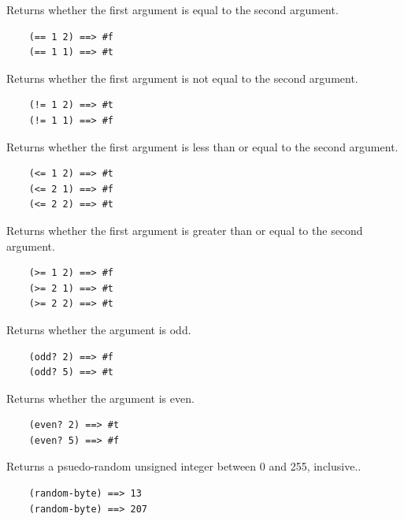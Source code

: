 \documentclass[12pt]{article}
\begin{document}
Returns whether the first argument is equal to the second argument.

\begin{verbatim}
    (== 1 2) ==> #f
    (== 1 1) ==> #t
\end{verbatim}


Returns whether the first argument is not equal to the second argument.

\begin{verbatim}
    (!= 1 2) ==> #t
    (!= 1 1) ==> #f
\end{verbatim}


Returns whether the first argument is less than or equal to the second
argument. 

\begin{verbatim}
    (<= 1 2) ==> #t
    (<= 2 1) ==> #f
    (<= 2 2) ==> #t
\end{verbatim}


Returns whether the first argument is greater than or equal to the
second argument. 

\begin{verbatim}
    (>= 1 2) ==> #f
    (>= 2 1) ==> #t
    (>= 2 2) ==> #t
\end{verbatim}


Returns whether the argument is odd.

\begin{verbatim}
    (odd? 2) ==> #f
    (odd? 5) ==> #t
\end{verbatim}


Returns whether the argument is even.

\begin{verbatim}
    (even? 2) ==> #t
    (even? 5) ==> #f
\end{verbatim}


Returns a psuedo-random unsigned integer between 0 and 255, inclusive..

\begin{verbatim}
    (random-byte) ==> 13
    (random-byte) ==> 207
\end{verbatim}
\end{document}
